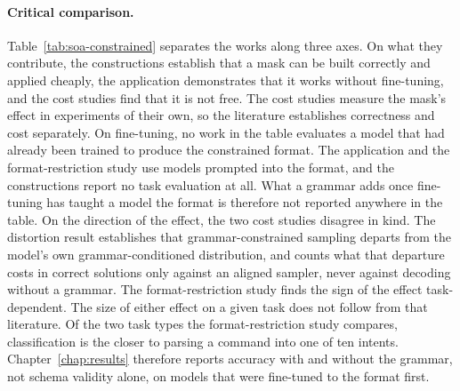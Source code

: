 \paragraph{Critical comparison.} Table~\ref{tab:soa-constrained} separates the works along three
axes. On what they contribute, the constructions establish that a mask can be built correctly and
applied cheaply, the application demonstrates that it works without fine-tuning, and the cost studies find
that it is not free. The cost studies measure the mask's effect in experiments of their own, so
the literature establishes correctness and cost separately. On fine-tuning, no work in the table
evaluates a model that had already been trained to produce the constrained format. The
application and the format-restriction study use models prompted into the format, and the
constructions report no task evaluation at all. What a grammar adds once fine-tuning has taught a
model the format is therefore not reported anywhere in the table. On the direction of the effect,
the two cost studies disagree in kind. The distortion result establishes that grammar-constrained
sampling departs from the model's own grammar-conditioned distribution, and counts what that
departure costs in correct solutions only against an aligned sampler, never against decoding
without a grammar. The format-restriction study finds the sign of the effect task-dependent. The
size of either effect on a given task does not follow from that literature. Of the two task types the
format-restriction study compares, classification is the closer to parsing a command into one of
ten intents. Chapter~\ref{chap:results} therefore reports accuracy with and without the grammar,
not schema validity alone, on models that were fine-tuned to the format first.

\clearpage
